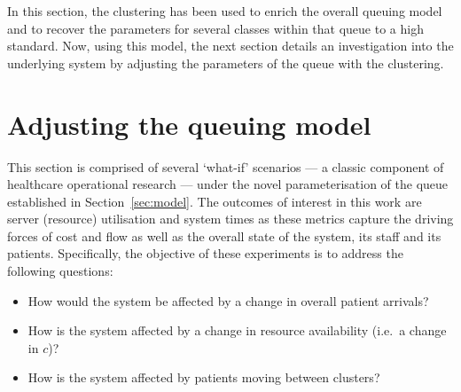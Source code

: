 \documentclass[11pt]{article}
\newlength{\tabwidth}
\begin{document}
\begin{table}
    \centering
    \caption{A comparison of the observed data, and the best and worst simulated
        data based on the model parameters and summary statistics for length of
    stay (LOS).}\label{tab:comparison}
\end{table}

In this section, the clustering has been used to enrich the overall queuing
model and to recover the parameters for several classes within that queue to a
high standard. Now, using this model, the next section details an investigation
into the underlying system by adjusting the parameters of the queue with the
clustering.

\section{Adjusting the queuing model}\label{sec:scenarios}

This section is comprised of several `what-if' scenarios --- a classic component
of healthcare operational research --- under the novel parameterisation of the
queue established in Section~\ref{sec:model}. The outcomes of interest in this
work are server (resource) utilisation and system times as these metrics capture
the driving forces of cost and flow as well as the overall state of the system,
its staff and its patients. Specifically, the objective of these experiments is
to address the following questions:
\begin{itemize}
    \item How would the system be affected by a change in overall patient
        arrivals?
    \item How is the system affected by a change in resource availability (i.e.\
        a change in \(c\))?
    \item How is the system affected by patients moving between clusters?
\end{itemize}
\end{document}
